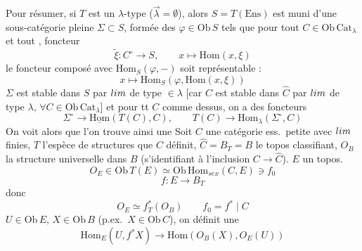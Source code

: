 \documentclass[11pt,a4paper]{article}
\begin{document}
Pour résumer, si $T$ est un $\lambda$-type ($\overrightarrow{\lambda}
= \emptyset$), alors $S = T(\mathrm{Ens})$ est muni d'une
sous-catégorie \struck{\ill{}} pleine $\Sigma \subset S$, formée des
$\varphi \in \mathrm{Ob}\,S$ tels que pour tout $C \in \mathrm{Ob}\,
\mathrm{Cat}_{\lambda}$ et tout \struck{\ill{}}
 ,
\struck{\ill{}}  \struck{\ill{}} foncteur
\[
  \widetilde{\xi} : C^{\circ} \longrightarrow S, \qquad x \longmapsto
  \mathrm{Hom}(x, \xi)
\]
le foncteur composé avec $\mathrm{Hom}_{S}(\varphi, -)$ soit
représentable  :
\[
  x \longmapsto \mathrm{Hom}_{S}(\varphi, \mathrm{Hom}(x, \xi))
\]
$\Sigma$ est stable dans $S$ par $\varinjlim$  de
type $\in \lambda$  [car $C$ est stable dans $\hat{C}$ par $\varprojlim$ de type
$\lambda$, $\forall C \in \mathrm{Ob}\,\mathrm{Cat}_{\lambda}$] et pour tt $C$
comme dessus, on a des foncteurs 
\[
  \Sigma^{\circ} \longrightarrow \underline{\mathrm{Hom}}(T(C), C),
  \qquad T(C) \longrightarrow \mathrm{Hom}_{\lambda}(\Sigma^{\circ}, C)
\]
On voit alors que l'on trouve ainsi une
Soit $C$ une catégorie ess.\ petite avec $\varprojlim$ finies, $T$
l'espèce de structures que $C$ définit, $\hat{C} = B_{T} = B$ le topos
classifiant, $O_{B}$ la structure universelle dans $B$ (s'identifiant
à l'inclusion $C \to \hat{C}$). $E$ un topos.
\[
  O_{E} \in \mathrm{Ob}\,T(E) \simeq \mathrm{Ob}\,\mathrm{Hom}_{sex}(C, E)
  \ni f_{0}
\]
\[
  f : E \longrightarrow B_{T}
\]
 donc
\[
  O_{E} \simeq f^{*}_{T}(O_{B}) \qquad f_{0} = f^{*} \mid C
\]
$U \in \mathrm{Ob}\,E$, $X \in \mathrm{Ob}\,B$ (p.ex.\ $X \in
\mathrm{Ob}\,C$), on définit une  
\begin{equation}
  \mathrm{Hom}_{E}(U, f^{*}X) \longrightarrow
  \mathrm{Hom}(O_{B}(X), O_{E}(U))
  \tag{1}
\end{equation}
\end{document}
